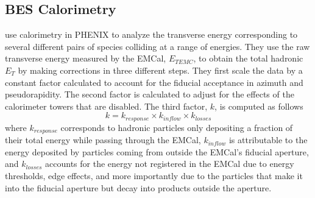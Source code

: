 \subsection{BES Calorimetry}
\citet{PhysRevC.93.024901} use calorimetry in PHENIX to analyze the transverse energy corresponding to several different pairs of species colliding at a range of energies. They use the raw transverse energy measured by the EMCal, $E_{{T}EMC}$, to obtain the total hadronic $E_{T}$ by making corrections in three different steps. They first scale the data by a constant factor calculated to account for the fiducial acceptance in azimuth and pseudorapidity. The second factor is calculated to adjust for the effects of the calorimeter towers that are disabled. The third factor, $k$, is computed as follows
\begin{equation}\label{eqn:AdareKfactor}
k = k_{response} \times k_{inflow} \times k_{losses}
\end{equation}
where $k_{response}$ corresponds to hadronic particles only depositing a fraction of their total energy while passing through the EMCal, $k_{inflow}$ is attributable to the energy deposited by particles coming from outside the EMCal's fiducial aperture, and $k_{losses}$ accounts for the energy not registered in the EMCal due to energy thresholds, edge effects, and more importantly due to the particles that make it into the fiducial aperture but decay into products outside the aperture.

